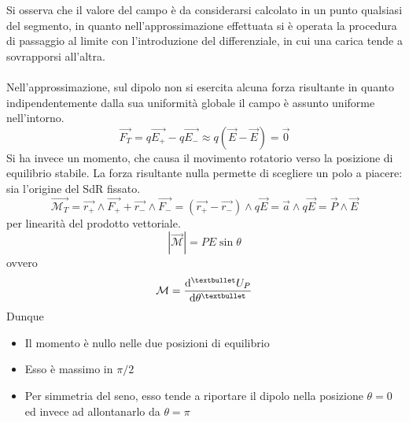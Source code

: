 Si osserva che il valore del campo è da considerarsi calcolato in un punto qualsiasi del segmento, in quanto nell'approssimazione effettuata si è operata la procedura di passaggio al limite con l'introduzione del differenziale, in cui una carica tende a sovrapporsi all'altra.
\\~\\
Nell'approssimazione, sul dipolo non si esercita alcuna forza risultante in quanto indipendentemente dalla sua uniformità globale il campo è assunto uniforme nell'intorno. 
\[\vec{F_T} = q \vec{E_+} - q \vec{E_-} \approx q (\vec{E} - \vec{E}) = \vec{0}\]
Si ha invece un momento, che causa il movimento rotatorio verso la posizione di equilibrio stabile. La forza risultante nulla permette di scegliere un polo a piacere: sia l'origine del SdR fissato.
\[\vec{\mathcal{M}_T} = \vec{r_+} \wedge \vec{F_+} + \vec{r_-} \wedge \vec{F_-} = (\vec{r_+} - \vec{r_-}) \wedge q \vec{E} = \vec{a} \wedge q \vec{E} = \vec{P} \wedge \vec{E}\]
per linearità del prodotto vettoriale. 
\[|\vec{\mathcal{M}}| = P E \sin \theta\]
ovvero
\[\mathcal{M} = \dv[•]{U_P}{\theta}\]
Dunque
\begin{itemize}
\item Il momento è nullo nelle due posizioni di equilibrio
\item Esso è massimo in $\pi/2$
\item Per simmetria del seno, esso tende a riportare il dipolo nella posizione $\theta = 0$ ed invece ad allontanarlo da $\theta = \pi$
\end{itemize}

